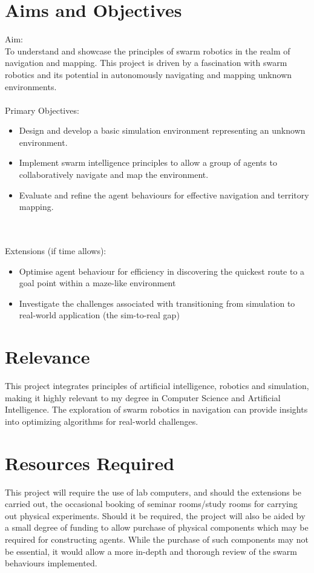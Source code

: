\documentclass[12pt]{article}
\begin{document}
\section{Aims and Objectives}
Aim:\\
To understand and showcase the principles of swarm robotics in the realm of navigation and mapping. This project is driven by a fascination with swarm robotics and its potential in autonomously navigating and mapping unknown environments.
\\
\\
Primary Objectives:\\
    \begin{itemize}
    \item Design and develop a basic simulation environment representing an unknown environment.
    \item Implement swarm intelligence principles to allow a group of agents to collaboratively navigate and map the environment.
    \item Evaluate and refine the agent behaviours for effective navigation and territory mapping.
    \end{itemize}
\\
\\
Extensions (if time allows):\\
    \begin{itemize}
        \item Optimise agent behaviour for efficiency in discovering the quickest route to a goal point within a maze-like environment
        \item Investigate the challenges associated with transitioning from simulation to real-world application (the sim-to-real gap)
    \end{itemize}

\section{Relevance}
This project integrates principles of artificial intelligence, robotics and simulation, making it highly relevant to my degree in Computer Science and Artificial Intelligence. The exploration of swarm robotics in navigation can provide insights into optimizing algorithms for real-world challenges.

\section{Resources Required}
This project will require the use of lab computers, and should the extensions be carried out, the occasional booking of seminar rooms/study rooms for carrying out physical experiments. Should it be required, the project will also be aided by a small degree of funding to allow purchase of physical components which may be required for constructing agents. While the purchase of such components may not be essential, it would allow a more in-depth and thorough review of the swarm behaviours implemented.
\end{document}

